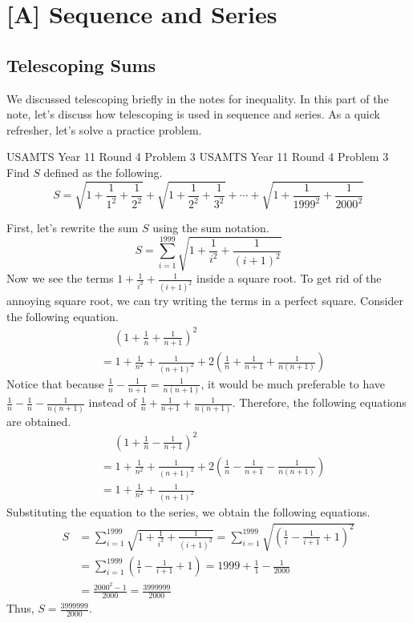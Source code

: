 \documentclass[../../main.tex]{subfiles}
\begin{document}
\chapter{[A] Sequence and Series}


\section{Telescoping Sums}

We discussed telescoping briefly in the notes for inequality. In this
part of the note, let's discuss how telescoping is used in sequence
and series. As a quick refresher, let's solve a practice problem.

\begin{problem}
{USAMTS Year 11 Round 4 Problem 3 \easy}
{USAMTS Year 11 Round 4 Problem 3}
Find $S$ defined as the following.
\[
S
= \sqrt{ 1 + \frac{1}{1^2} + \frac{1}{2^2} }
    + \sqrt{ 1 + \frac{1}{2^2} + \frac{1}{3^2} } + \cdots
    + \sqrt{ 1 + \frac{1}{1999^2} + \frac{1}{2000^2} }
\]
\end{problem}
\begin{solution}
First, let's rewrite the sum $S$ using the sum notation.
\[
S
= \sum_{i=1}^{1999}
    \sqrt{ 1 + \frac{1}{i^2} + \frac{1}{(i + 1)^2} }
\]
Now we see the terms $1 + \frac{1}{i^2} + \frac{1}{(i + 1)^2}$
inside a square root. To get rid of the annoying square root,
we can try writing the terms in a perfect square. Consider the
following equation.
\begin{align*}
    &\quad\ \left( 1 + \frac{1}{n} + \frac{1}{n + 1} \right)^2 \\
    &= 1 + \frac{1}{n^2} + \frac{1}{(n + 1)^2} + 2 \left(
        \frac{1}{n} + \frac{1}{n + 1} + \frac{1}{n(n + 1)}
    \right)
\end{align*}
Notice that because $\frac{1}{n} - \frac{1}{n+1} = \frac{1}{n(n+1)}$,
it would be much preferable to have $\frac{1}{n} - \frac{1}{n}
- \frac{1}{n(n+1)}$ instead of $\frac{1}{n} + \frac{1}{n + 1} +
\frac{1}{n(n + 1)}$. Therefore, the following equations are obtained.
\begin{align*}
    &\quad\ \left( 1 + \frac{1}{n} - \frac{1}{n + 1} \right)^2 \\
    &= 1 + \frac{1}{n^2} + \frac{1}{(n + 1)^2} + 2 \left(
        \frac{1}{n} - \frac{1}{n + 1} - \frac{1}{n(n + 1)}
    \right) \\
    &= 1 + \frac{1}{n^2} + \frac{1}{(n + 1)^2}
\end{align*}
Substituting the equation to the series, we obtain the following
equations.
\begin{align*}
    S
    &= \sum_{i=1}^{1999}
        \sqrt{1 + \frac{1}{i^2} + \frac{1}{(i + 1)^2}}
    = \sum_{i=1}^{1999} \sqrt{\left(
        \frac{1}{i} - \frac{1}{i + 1} + 1
    \right)^2} \\
    &= \sum_{i=1}^{1999}
        \left( \frac{1}{i} - \frac{1}{i + 1} + 1 \right)
    = 1999 + \frac{1}{1} - \frac{1}{2000} \\
    &= \frac{2000^2 - 1}{2000}
    = \frac{3999999}{2000}
\end{align*}
Thus, $S = \frac{3999999}{2000}$.
\end{solution}
\end{document}
